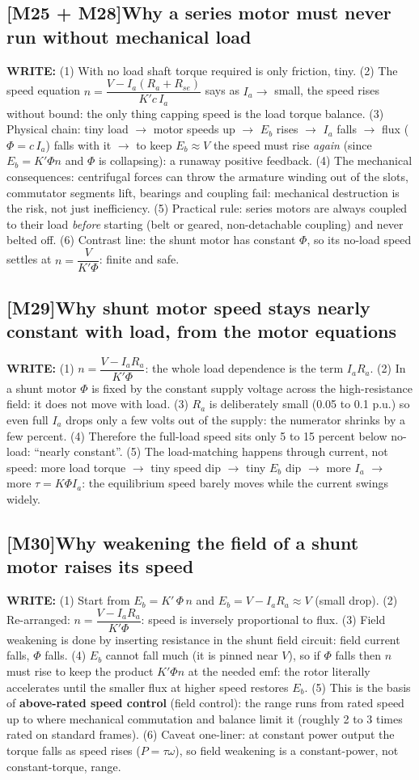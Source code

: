 \documentclass[11pt]{article}
\newcommand{\q}[2]{\subsection*{\color{copper}#1\quad\color{iron}#2}}
\newcommand{\w}[1]{\textbf{\color{copper}WRITE:} #1}
\begin{document}
\q{[M25 + M28]}{Why a series motor must never run without mechanical load}
\w{(1) With no load shaft torque required is only friction, tiny. (2) The speed equation $n = \dfrac{V - I_a(R_a + R_{se})}{K' c\, I_a}$ says as $I_a \rightarrow$ small, the speed rises without bound: the only thing capping speed is the load torque balance. (3) Physical chain: tiny load $\rightarrow$ motor speeds up $\rightarrow$ $E_b$ rises $\rightarrow$ $I_a$ falls $\rightarrow$ flux ($\Phi = c\, I_a$) falls with it $\rightarrow$ to keep $E_b \approx V$ the speed must rise \emph{again} (since $E_b = K' \Phi n$ and $\Phi$ is collapsing): a runaway positive feedback. (4) The mechanical consequences: centrifugal forces can throw the armature winding out of the slots, commutator segments lift, bearings and coupling fail: mechanical destruction is the risk, not just inefficiency. (5) Practical rule: series motors are always coupled to their load \emph{before} starting (belt or geared, non-detachable coupling) and never belted off. (6) Contrast line: the shunt motor has constant $\Phi$, so its no-load speed settles at $n = \dfrac{V}{K' \Phi}$: finite and safe.}

\q{[M29]}{Why shunt motor speed stays nearly constant with load, from the motor equations}
\w{(1) $n = \dfrac{V - I_a R_a}{K' \Phi}$: the whole load dependence is the term $I_a R_a$. (2) In a shunt motor $\Phi$ is fixed by the constant supply voltage across the high-resistance field: it does not move with load. (3) $R_a$ is deliberately small (0.05 to 0.1 p.u.) so even full $I_a$ drops only a few volts out of the supply: the numerator shrinks by a few percent. (4) Therefore the full-load speed sits only 5 to 15 percent below no-load: ``nearly constant''. (5) The load-matching happens through current, not speed: more load torque $\rightarrow$ tiny speed dip $\rightarrow$ tiny $E_b$ dip $\rightarrow$ more $I_a$ $\rightarrow$ more $\tau = K \Phi I_a$: the equilibrium speed barely moves while the current swings widely.}

\q{[M30]}{Why weakening the field of a shunt motor raises its speed}
\w{(1) Start from $E_b = K'\, \Phi\, n$ and $E_b = V - I_a R_a \approx V$ (small drop). (2) Re-arranged: $n = \dfrac{V - I_a R_a}{K' \Phi}$: speed is inversely proportional to flux. (3) Field weakening is done by inserting resistance in the shunt field circuit: field current falls, $\Phi$ falls. (4) $E_b$ cannot fall much (it is pinned near $V$), so if $\Phi$ falls then $n$ must rise to keep the product $K' \Phi n$ at the needed emf: the rotor literally accelerates until the smaller flux at higher speed restores $E_b$. (5) This is the basis of \textbf{above-rated speed control} (field control): the range runs from rated speed up to where mechanical commutation and balance limit it (roughly 2 to 3 times rated on standard frames). (6) Caveat one-liner: at constant power output the torque falls as speed rises ($P = \tau \omega$), so field weakening is a constant-power, not constant-torque, range.}
\end{document}
